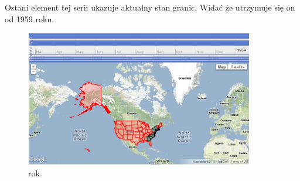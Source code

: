 Ostani element tej serii ukazuje aktualny stan granic. Widać że utrzymuje się on od 1959 roku.

\begin{figure}[H]
  \centering
    \includegraphics[width=100mm]{ge/st3.jpg}
  \caption{rok.}
  \label{fig:st3}
\end{figure}
